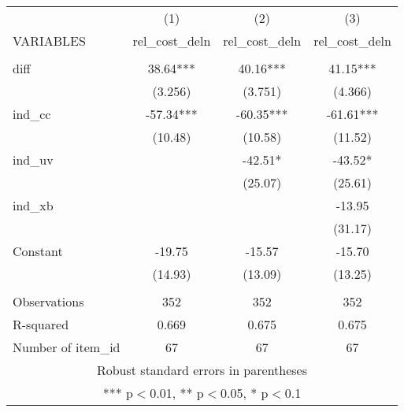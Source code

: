 \documentclass[]{article}
\begin{document}
\begin{tabular}{lccc} \hline
 & (1) & (2) & (3) \\
VARIABLES & rel\_cost\_deln & rel\_cost\_deln & rel\_cost\_deln \\ \hline
 &  &  &  \\
diff & 38.64*** & 40.16*** & 41.15*** \\
 & (3.256) & (3.751) & (4.366) \\
ind\_cc & -57.34*** & -60.35*** & -61.61*** \\
 & (10.48) & (10.58) & (11.52) \\
ind\_uv &  & -42.51* & -43.52* \\
 &  & (25.07) & (25.61) \\
ind\_xb &  &  & -13.95 \\
 &  &  & (31.17) \\
Constant & -19.75 & -15.57 & -15.70 \\
 & (14.93) & (13.09) & (13.25) \\
 &  &  &  \\
Observations & 352 & 352 & 352 \\
R-squared & 0.669 & 0.675 & 0.675 \\
 Number of item\_id & 67 & 67 & 67 \\ \hline
\multicolumn{4}{c}{ Robust standard errors in parentheses} \\
\multicolumn{4}{c}{ *** p$<$0.01, ** p$<$0.05, * p$<$0.1} \\
\end{tabular}
\end{document}
